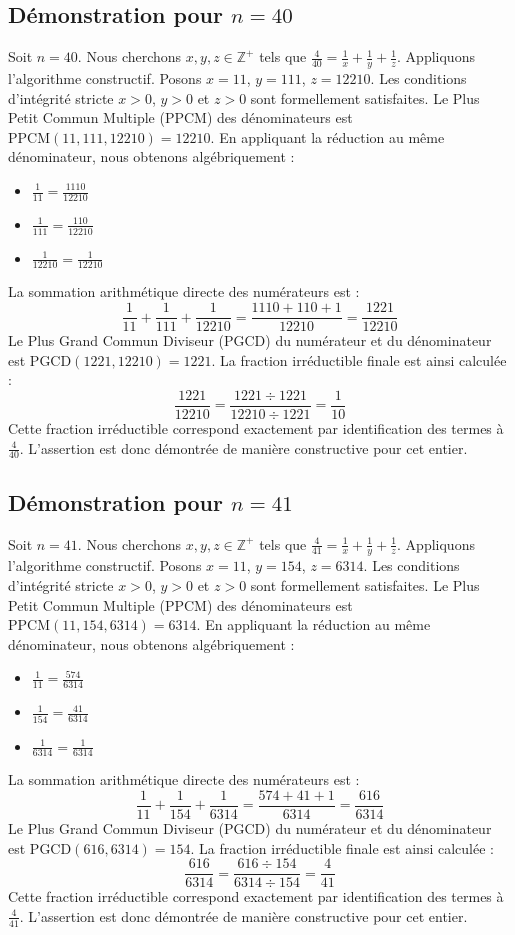 \documentclass[11pt,a4paper]{article}
\begin{document}
\subsection{Démonstration pour $n = 40$}
Soit $n = 40$. Nous cherchons $x, y, z \in \mathbb{Z}^{+}$ tels que $\frac{4}{40} = \frac{1}{x} + \frac{1}{y} + \frac{1}{z}$.
Appliquons l'algorithme constructif. Posons $x = 11$, $y = 111$, $z = 12210$.
Les conditions d'intégrité stricte $x > 0$, $y > 0$ et $z > 0$ sont formellement satisfaites.
Le Plus Petit Commun Multiple (PPCM) des dénominateurs est $\text{PPCM}(11, 111, 12210) = 12210$.
En appliquant la réduction au même dénominateur, nous obtenons algébriquement :
\begin{itemize}
    \item $\frac{1}{11} = \frac{1110}{12210}$
    \item $\frac{1}{111} = \frac{110}{12210}$
    \item $\frac{1}{12210} = \frac{1}{12210}$
\end{itemize}
La sommation arithmétique directe des numérateurs est :
$$ \frac{1}{11} + \frac{1}{111} + \frac{1}{12210} = \frac{1110 + 110 + 1}{12210} = \frac{1221}{12210} $$
Le Plus Grand Commun Diviseur (PGCD) du numérateur et du dénominateur est $\text{PGCD}(1221, 12210) = 1221$.
La fraction irréductible finale est ainsi calculée :
$$ \frac{1221}{12210} = \frac{1221 \div 1221}{12210 \div 1221} = \frac{1}{10} $$
Cette fraction irréductible correspond exactement par identification des termes à $\frac{4}{40}$. L'assertion est donc démontrée de manière constructive pour cet entier.

\subsection{Démonstration pour $n = 41$}
Soit $n = 41$. Nous cherchons $x, y, z \in \mathbb{Z}^{+}$ tels que $\frac{4}{41} = \frac{1}{x} + \frac{1}{y} + \frac{1}{z}$.
Appliquons l'algorithme constructif. Posons $x = 11$, $y = 154$, $z = 6314$.
Les conditions d'intégrité stricte $x > 0$, $y > 0$ et $z > 0$ sont formellement satisfaites.
Le Plus Petit Commun Multiple (PPCM) des dénominateurs est $\text{PPCM}(11, 154, 6314) = 6314$.
En appliquant la réduction au même dénominateur, nous obtenons algébriquement :
\begin{itemize}
    \item $\frac{1}{11} = \frac{574}{6314}$
    \item $\frac{1}{154} = \frac{41}{6314}$
    \item $\frac{1}{6314} = \frac{1}{6314}$
\end{itemize}
La sommation arithmétique directe des numérateurs est :
$$ \frac{1}{11} + \frac{1}{154} + \frac{1}{6314} = \frac{574 + 41 + 1}{6314} = \frac{616}{6314} $$
Le Plus Grand Commun Diviseur (PGCD) du numérateur et du dénominateur est $\text{PGCD}(616, 6314) = 154$.
La fraction irréductible finale est ainsi calculée :
$$ \frac{616}{6314} = \frac{616 \div 154}{6314 \div 154} = \frac{4}{41} $$
Cette fraction irréductible correspond exactement par identification des termes à $\frac{4}{41}$. L'assertion est donc démontrée de manière constructive pour cet entier.
\end{document}
